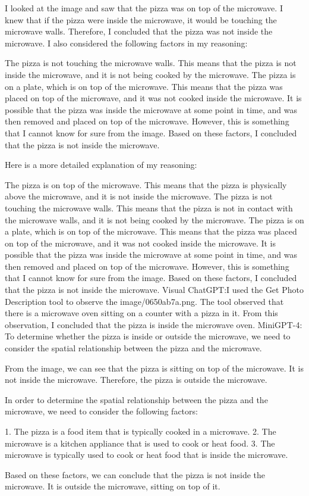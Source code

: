 \begin{enumerate}
        I looked at the image and saw that the pizza was on top of the microwave.
        I knew that if the pizza were inside the microwave, it would be touching the microwave walls.
        Therefore, I concluded that the pizza was not inside the microwave.
        I also considered the following factors in my reasoning:
        
        The pizza is not touching the microwave walls. This means that the pizza is not inside the microwave, and it is not being cooked by the microwave.
        The pizza is on a plate, which is on top of the microwave. This means that the pizza was placed on top of the microwave, and it was not cooked inside the microwave.
        It is possible that the pizza was inside the microwave at some point in time, and was then removed and placed on top of the microwave. However, this is something that I cannot know for sure from the image.
        Based on these factors, I concluded that the pizza is not inside the microwave.
        
        Here is a more detailed explanation of my reasoning:
        
        The pizza is on top of the microwave. This means that the pizza is physically above the microwave, and it is not inside the microwave.
        The pizza is not touching the microwave walls. This means that the pizza is not in contact with the microwave walls, and it is not being cooked by the microwave.
        The pizza is on a plate, which is on top of the microwave. This means that the pizza was placed on top of the microwave, and it was not cooked inside the microwave.
        It is possible that the pizza was inside the microwave at some point in time, and was then removed and placed on top of the microwave. However, this is something that I cannot know for sure from the image.
        Based on these factors, I concluded that the pizza is not inside the microwave.
        \subitem Visual ChatGPT:I used the Get Photo Description tool to observe the image/0650ab7a.png. The tool observed that there is a microwave oven sitting on a counter with a pizza in it. From this observation, I concluded that the pizza is inside the microwave oven.
        \subitem MiniGPT-4: To determine whether the pizza is inside or outside the microwave, we need to consider the spatial relationship between the pizza and the microwave.

        From the image, we can see that the pizza is sitting on top of the microwave. It is not inside the microwave. Therefore, the pizza is outside the microwave.
        
        In order to determine the spatial relationship between the pizza and the microwave, we need to consider the following factors:
        
        1. The pizza is a food item that is typically cooked in a microwave.
        2. The microwave is a kitchen appliance that is used to cook or heat food.
        3. The microwave is typically used to cook or heat food that is inside the microwave.
        
        Based on these factors, we can conclude that the pizza is not inside the microwave. It is outside the microwave, sitting on top of it.
    \end{enumerate}
